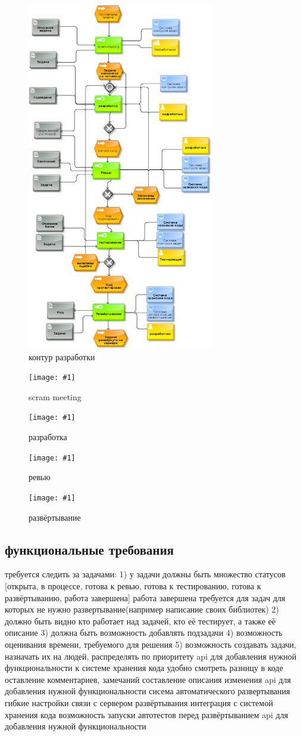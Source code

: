 \documentclass{article}
\begin{document}
\newcommand{\dia}[2]{
    \begin{figure}[!h]
        \texttt{[image: \#1]}
        \caption{#2}
    \end{figure}
    \pagebreak
}

\begin{figure}[h!]
    \includegraphics[height=6in]{pictures/2.png}
    \caption{контур разработки}
\end{figure}
\pagebreak
\dia{pictures/3.png}{scram meeting}
\dia{pictures/4.png}{разработка}
\dia{pictures/5.png}{ревью}
\dia{pictures/7.png}{развёртывание}

\subsection{функциональные требования}
требуется следить за задачами:
    1) у задачи должны быть множество статусов
    [открыта, в процессе, готова к ревью, готова к тестированию, готова к развёртыванию, работа завершена]
    работа завершена требуется для задач для которых не нужно развертывание(например написание своих библиотек)
    2) должно быть видно кто работает над задачей, кто её тестирует, а также её описание
    3) должна быть возможность добавлять подзадачи
    4) возможность оценивания времени, требуемого для решения
    5) возможность создавать задачи, назначать их на людей, распределять по приоритету
    api для добавления нужной функциональности
к системе хранения кода
    удобно смотреть разницу в коде
    оставление комментариев, замечаний
    составление описания изменения
    api для добавления нужной функциональности
сисема автоматического развертывания
    гибкие настройки связи с сервером развёртывания
    интеграция с системой хранения кода
    возможность запуски автотестов перед развёртыванием
    api для добавления нужной функциональности
\end{document}
